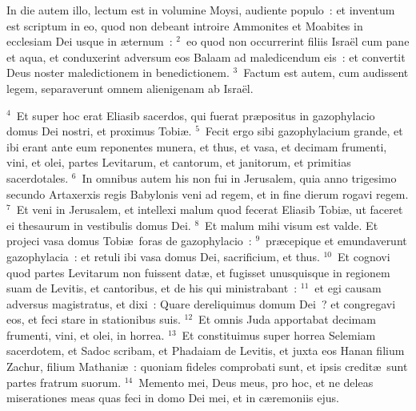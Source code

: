\lettrine[lines=10,image=true,loversize=0.05,lraise=-0.03]{I}{}n die autem illo, lectum est in volumine Moysi, audiente populo~: et inventum est scriptum in eo, quod non debeant introire Ammonites et Moabites in ecclesiam Dei usque in \ae ternum~:
${}^{2}$~eo quod non occurrerint filiis Isra\"el cum pane et aqua, et conduxerint adversum eos Balaam ad maledicendum eis~: et convertit Deus noster maledictionem in benedictionem.
${}^{3}$~Factum est autem, cum audissent legem, separaverunt omnem alienigenam ab Isra\"el.


${}^{4}$~Et super hoc erat Eliasib sacerdos, qui fuerat pr\ae positus in gazophylacio domus Dei nostri, et proximus Tobi\ae .
${}^{5}$~Fecit ergo sibi gazophylacium grande, et ibi erant ante eum reponentes munera, et thus, et vasa, et decimam frumenti, vini, et olei, partes Levitarum, et cantorum, et janitorum, et primitias sacerdotales.
${}^{6}$~In omnibus autem his non fui in Jerusalem, quia anno trigesimo secundo Artaxerxis regis Babylonis veni ad regem, et in fine dierum rogavi regem.
${}^{7}$~Et veni in Jerusalem, et intellexi malum quod fecerat Eliasib Tobi\ae , ut faceret ei thesaurum in vestibulis domus Dei.
${}^{8}$~Et malum mihi visum est valde. Et projeci vasa domus Tobi\ae\ foras de gazophylacio~:
${}^{9}$~pr\ae cepique et emundaverunt gazophylacia~: et retuli ibi vasa domus Dei, sacrificium, et thus.
${}^{10}$~Et cognovi quod partes Levitarum non fuissent dat\ae , et fugisset unusquisque in regionem suam de Levitis, et cantoribus, et de his qui ministrabant~:
${}^{11}$~et egi causam adversus magistratus, et dixi~: Quare dereliquimus domum Dei~? et congregavi eos, et feci stare in stationibus suis.
${}^{12}$~Et omnis Juda apportabat decimam frumenti, vini, et olei, in horrea.
${}^{13}$~Et constituimus super horrea Selemiam sacerdotem, et Sadoc scribam, et Phadaiam de Levitis, et juxta eos Hanan filium Zachur, filium Mathani\ae~: quoniam fideles comprobati sunt, et ipsis credit\ae\ sunt partes fratrum suorum.
${}^{14}$~Memento mei, Deus meus, pro hoc, et ne deleas miserationes meas quas feci in domo Dei mei, et in c\ae remoniis ejus.


